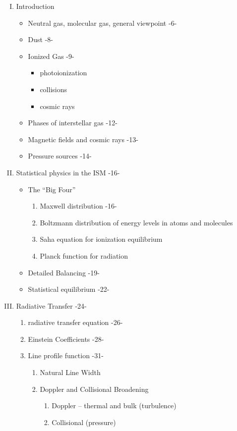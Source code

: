 \documentclass{article}
\begin{document}
\begin{enumerate}[I.]

\item Introduction
\begin{itemize}
  \item Neutral gas, molecular gas, general viewpoint -6-
  \item Dust -8-
  \item Ionized Gas -9-
      \begin{itemize}
          \item photoionization
          \item collisions
          \item cosmic rays
      \end{itemize}
  \item Phases of interstellar gas -12-
  \item Magnetic fields and cosmic rays -13-
  \item Pressure sources -14-
\end{itemize}

\item Statistical physics in the ISM -16-
\begin{itemize}
    \item The ``Big Four''
    \begin{enumerate}[1.]
        \item Maxwell distribution -16-
        \item Boltzmann distribution of energy levels in atoms and molecules
        \item Saha equation for ionization equilibrium
        \item Planck function for radiation
    \end{enumerate}
    \item Detailed Balancing -19-
    \item Statistical equilibrium -22-
\end{itemize}


\item Radiative Transfer -24-
\begin{enumerate}%
  \item radiative transfer equation -26-
  \item Einstein Coefficients -28-
  \item Line profile function -31-
  \begin{enumerate}
    \item Natural Line Width
    \item Doppler and Collisional Broadening
    \begin{enumerate}%
      \item Doppler -- thermal and bulk (turbulence)
      \item Collisional (pressure)
    \end{enumerate}
  \end{enumerate}
\end{enumerate}


\end{enumerate}
\end{document}
